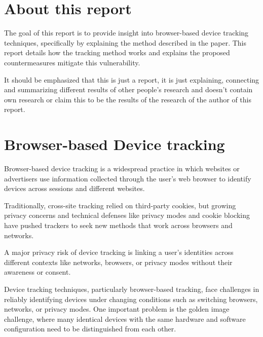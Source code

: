 \documentclass{report}
\begin{document}
\section{About this report}
\label{sec:goal_of_this_report}

The goal of this report is to provide insight into \alert{browser-based device tracking techniques}, specifically by explaining the method described in the paper\cite{kol2022devicetrackinglinuxsnew}. This report details \alert{how} the tracking method \alert{works} and explains the \alert{proposed countermeasures} mitigate this vulnerability.

\alert{It should be emphasized that this is just a report, it is just explaining, connecting and summarizing different results of other people's research and doesn't contain own research or claim this to be the results of the research of the author of this report}. 


\section{Browser-based Device tracking}
\label{sec:Online browser-based device tracking}

\alert{Browser-based device tracking} is a widespread practice in which websites or advertisers use information collected through the user’s web browser to identify devices across sessions and different websites.

Traditionally, cross-site tracking relied on \alert{third-party cookies}, but growing privacy concerns and technical defenses like privacy modes and cookie blocking have pushed trackers to seek new methods that work across browsers and networks.

A major \alert{privacy risk} of device tracking is linking a user’s identities across different contexts like networks, browsers, or privacy modes without their awareness or consent.


Device tracking techniques, particularly browser-based tracking, face challenges in reliably identifying devices under changing conditions such as switching browsers, networks, or privacy modes. One important problem is the \alert{golden image challenge}, where many identical devices with the same hardware and software configuration need to be distinguished from each other.  
\end{document}
